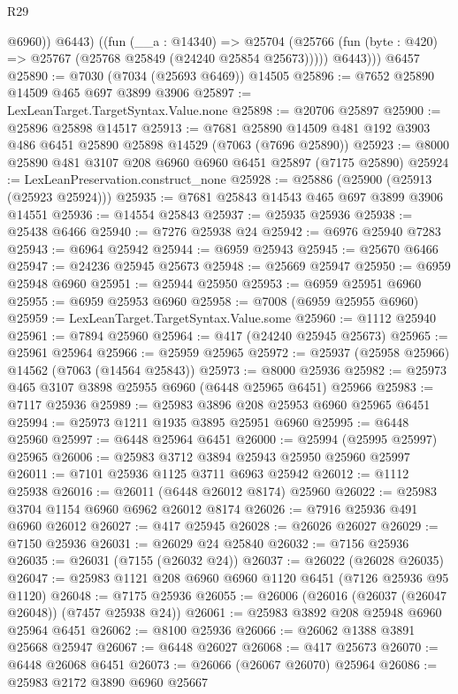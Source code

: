 \begin{lexlean}{R29}
\begin{coremodule}
            @6960))
          @6443)
        ((fun (__a : @14340) =>
        @25704 (@25766 (fun (byte : @420) => @25767 (@25768 @25849 (@24240 @25854 @25673)))))
          @6443)))
    @6457
@25890 := @7030 (@7034 (@25693 @6469)) @14505
@25896 := @7652 @25890 @14509 @465 @697 @3899 @3906
@25897 := LexLeanTarget.TargetSyntax.Value.none
@25898 := @20706 @25897
@25900 := @25896 @25898 @14517
@25913 := @7681 @25890 @14509 @481 @192 @3903 @486 @6451 @25890 @25898 @14529 (@7063 (@7696 @25890))
@25923 := @8000 @25890 @481 @3107 @208 @6960 @6960 @6451 @25897 (@7175 @25890)
@25924 := LexLeanPreservation.construct_none
@25928 := @25886 (@25900 (@25913 (@25923 @25924)))
@25935 := @7681 @25843 @14543 @465 @697 @3899 @3906 @14551
@25936 := @14554 @25843
@25937 := @25935 @25936
@25938 := @25438 @6466
@25940 := @7276 @25938 @24
@25942 := @6976 @25940 @7283
@25943 := @6964 @25942
@25944 := @6959 @25943
@25945 := @25670 @6466
@25947 := @24236 @25945 @25673
@25948 := @25669 @25947
@25950 := @6959 @25948 @6960
@25951 := @25944 @25950
@25953 := @6959 @25951 @6960
@25955 := @6959 @25953 @6960
@25958 := @7008 (@6959 @25955 @6960)
@25959 := LexLeanTarget.TargetSyntax.Value.some
@25960 := @1112 @25940
@25961 := @7894 @25960
@25964 := @417 (@24240 @25945 @25673)
@25965 := @25961 @25964
@25966 := @25959 @25965
@25972 := @25937 (@25958 @25966) @14562 (@7063 (@14564 @25843))
@25973 := @8000 @25936
@25982 := @25973 @465 @3107 @3898 @25955 @6960 (@6448 @25965 @6451) @25966
@25983 := @7117 @25936
@25989 := @25983 @3896 @208 @25953 @6960 @25965 @6451
@25994 := @25973 @1211 @1935 @3895 @25951 @6960
@25995 := @6448 @25960
@25997 := @6448 @25964 @6451
@26000 := @25994 (@25995 @25997) @25965
@26006 := @25983 @3712 @3894 @25943 @25950 @25960 @25997
@26011 := @7101 @25936 @1125 @3711 @6963 @25942
@26012 := @1112 @25938
@26016 := @26011 (@6448 @26012 @8174) @25960
@26022 := @25983 @3704 @1154 @6960 @6962 @26012 @8174
@26026 := @7916 @25936 @491 @6960 @26012
@26027 := @417 @25945
@26028 := @26026 @26027
@26029 := @7150 @25936
@26031 := @26029 @24 @25840
@26032 := @7156 @25936
@26035 := @26031 (@7155 (@26032 @24))
@26037 := @26022 (@26028 @26035)
@26047 := @25983 @1121 @208 @6960 @6960 @1120 @6451 (@7126 @25936 @95 @1120)
@26048 := @7175 @25936
@26055 := @26006 (@26016 (@26037 (@26047 @26048)) (@7457 @25938 @24))
@26061 := @25983 @3892 @208 @25948 @6960 @25964 @6451
@26062 := @8100 @25936
@26066 := @26062 @1388 @3891 @25668 @25947
@26067 := @6448 @26027
@26068 := @417 @25673
@26070 := @6448 @26068 @6451
@26073 := @26066 (@26067 @26070) @25964
@26086 := @25983
    @2172
    @3890
    @6960
    @25667

\end{coremodule}
\end{lexlean}
